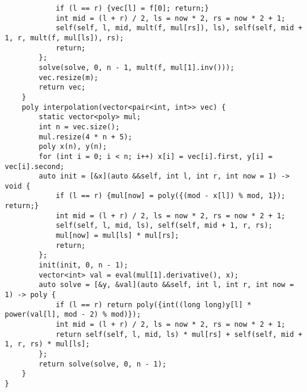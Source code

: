 \begin{verbatim}
            if (l == r) {vec[l] = f[0]; return;}
            int mid = (l + r) / 2, ls = now * 2, rs = now * 2 + 1;
            self(self, l, mid, mult(f, mul[rs]), ls), self(self, mid + 1, r, mult(f, mul[ls]), rs);
            return;
        };
        solve(solve, 0, n - 1, mult(f, mul[1].inv()));
        vec.resize(m);
        return vec;
    }
    poly interpolation(vector<pair<int, int>> vec) {
        static vector<poly> mul;
        int n = vec.size();
        mul.resize(4 * n + 5);
        poly x(n), y(n);
        for (int i = 0; i < n; i++) x[i] = vec[i].first, y[i] = vec[i].second;
        auto init = [&x](auto &&self, int l, int r, int now = 1) -> void {
            if (l == r) {mul[now] = poly({(mod - x[l]) % mod, 1}); return;}
            int mid = (l + r) / 2, ls = now * 2, rs = now * 2 + 1;
            self(self, l, mid, ls), self(self, mid + 1, r, rs);
            mul[now] = mul[ls] * mul[rs];
            return;
        };
        init(init, 0, n - 1);
        vector<int> val = eval(mul[1].derivative(), x);
        auto solve = [&y, &val](auto &&self, int l, int r, int now = 1) -> poly {
            if (l == r) return poly({int((long long)y[l] * power(val[l], mod - 2) % mod)});
            int mid = (l + r) / 2, ls = now * 2, rs = now * 2 + 1;
            return self(self, l, mid, ls) * mul[rs] + self(self, mid + 1, r, rs) * mul[ls];
        };
        return solve(solve, 0, n - 1);
    }
}
\end{verbatim}